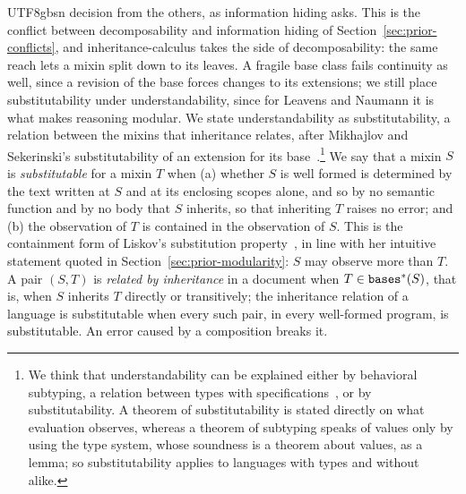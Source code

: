 \begin{CJK*}{UTF8}{gbsn}
decision from the others, as information hiding asks.
This is the conflict between decomposability and information hiding of
Section~\ref{sec:prior-conflicts}, and inheritance-calculus takes the side of decomposability: the same
reach lets a mixin split down to its leaves. A fragile
base class fails continuity as well, since a revision of the base forces changes to its extensions; we
still place substitutability under understandability, since for Leavens and Naumann it is what makes
reasoning modular. We state understandability as substitutability, a relation between the mixins that
inheritance relates, after Mikhajlov and Sekerinski's substitutability of an extension for its
base~\cite{mikhajlov1998-fragile-base-class}.\footnote{We think that understandability can be explained
either by behavioral subtyping, a relation between types with
specifications~\cite{liskov1994-behavioral-subtyping, leavens2015-behavioral-subtyping-modular-reasoning},
or by substitutability. A theorem of substitutability is stated directly on what evaluation observes,
whereas a theorem of subtyping speaks of values only by using the type system, whose soundness is a
theorem about values, as a lemma; so substitutability applies to languages with types and without
alike.}
We say that a mixin $S$ is \emph{substitutable} for a mixin $T$ when (a) whether $S$ is well
formed is determined by the text written at $S$ and at its enclosing scopes alone, and so by no semantic
function and by no body that $S$ inherits, so that inheriting $T$ raises no error; and (b) the observation
of $T$ is contained in the observation of $S$. This is the containment form of Liskov's substitution
property~\cite{liskov1987-data-abstraction-hierarchy}, in line with her intuitive statement quoted in
Section~\ref{sec:prior-modularity}: $S$ may observe more than $T$. A pair $(S, T)$ is
\emph{related by inheritance} in a document when $T \in \mathtt{bases}^*(S)$, that is, when $S$ inherits $T$
directly or transitively; the inheritance relation of a language is substitutable when every such pair,
in every well-formed program, is substitutable. An error caused by a composition breaks it.
\fi


\end{CJK*}
